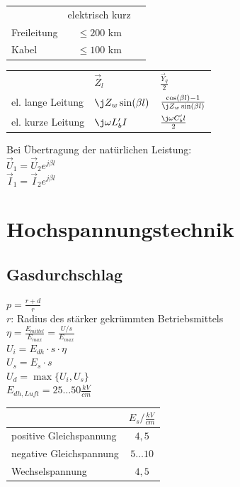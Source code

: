 \documentclass[european]{latex4ei_sheet}
\begin{document}
		\begin{tabular}{lcc}
		 & elektrisch kurz \\
		Freileitung & $\le 200$ km \\
		Kabel & $\le 100$ km
		\end{tabular}

		
		\begin{tabular}{lll}
		& $\vec Z_l$ & $\frac{\vec Y_q}{2}$\\[0.5em] \mrule
		el. lange Leitung & $\j Z_w \sin(\beta l)$ & $\frac{\cos(\beta l) -1}{\j Z_w \sin(\beta l)}$\\[0.5em]
		el. kurze Leitung & $\j \omega L'_b I$ & $\frac{\j \omega C'_b l}{2}$\\[0.5em]
		\end{tabular}
		
		Bei Übertragung der natürlichen Leistung: \\
		$\vec U_1 = \vec U_2 e^{j \beta l}$ \\
		$\vec I_1 = \vec I_2 e^{j \beta l}$ \\


	\section{Hochspannungstechnik}
		\subsection{Gasdurchschlag}
		$p = \frac{r + d}{r}$ \\
		$r$: Radius des stärker gekrümmten Betriebsmittels \\
		$\eta = \frac{E_{mittel}}{E_{max}} = \frac{U/s}{E_{max}}$ \\
		$U_i = E_{dh} \cdot s \cdot \eta$ \\
		$U_s = E_s \cdot s$ \\
		$U_d = \max\{U_i, U_s\}$ \\
		$E_{dh,Luft} = 25 \hdots 50 \frac{kV}{cm}$ \\
		\begin{tabular}{l|c}
		 & $E_s / \frac{kV}{cm}$ \\ \hline
		 positive Gleichspannung & $4,5$ \\ \hline
		 negative Gleichspannung & $5 \hdots 10$ \\ \hline
		 Wechselspannung & $4,5$
		\end{tabular}
\end{document}
